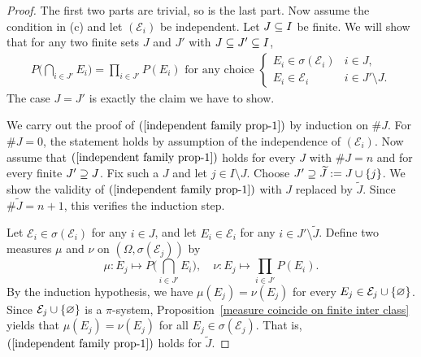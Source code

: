 \begin{proof}
The first two parts are trivial, so is the last part. Now assume the condition in (c) and let $(\mathcal{E}_i)$ be independent. Let $J\subseteq I$ be finite. We will show that for any two finite sets $J$ and $J'$ with $J\subseteq J'\subseteq I$,
\begin{align}\label{independent family prop-1}
P\Big(\bigcap_{i\in J'}E_i\Big)=\prod_{i\in J'}P(E_i)\text{ for any choice }\begin{cases}
E_i\in\sigma(\mathcal{E}_i)&i\in J,\\
E_i\in\mathcal{E}_i&i\in J'\setminus J.
\end{cases}
\end{align}
The case $J=J'$ is exactly the claim we have to show.\par
We carry out the proof of $(\ref{independent family prop-1})$ by induction on $\#J$. For $\#J=0$, the statement holds by assumption of the independence of $(\mathcal{E}_i)$. Now assume that $(\ref{independent family prop-1})$ holds for every $J$ with $\#J=n$ and for every finite $J'\supseteq J$. Fix such a $J$ and let $j\in I\setminus J$. Choose $J'\supseteq\widetilde{J}:=J\cup\{j\}$. We show the validity of $(\ref{independent family prop-1})$ with $J$ replaced by $\widetilde{J}$. Since $\#\widetilde{J}=n+1$, this verifies the induction step.\par
Let $\mathcal{E}_i\in\sigma(\mathcal{E}_i)$ for any $i\in J$, and let $E_i\in\mathcal{E}_i$ for any $i\in J'\setminus \widetilde{J}$. Define two measures $\mu$ and $\nu$ on $(\Omega,\sigma(\mathcal{E}_j))$ by
\[\mu:E_j\mapsto P\Big(\bigcap_{i\in J'}E_i\Big),\quad\nu:E_j\mapsto \prod_{i\in J'}P(E_i).\]
By the induction hypothesis, we have $\mu(E_j)=\nu(E_j)$ for every $E_j\in \mathcal{E}_j\cup\{\varnothing\}$. Since $\mathcal{E}_j\cup\{\varnothing\}$ is a $\pi$-system, Proposition~\ref{measure coincide on finite inter class} yields that $\mu(E_j)=\nu(E_j)$ for all $E_j\in\sigma(\mathcal{E}_j)$. That is, $(\ref{independent family prop-1})$ holds for $\widetilde{J}$.
\end{proof}
